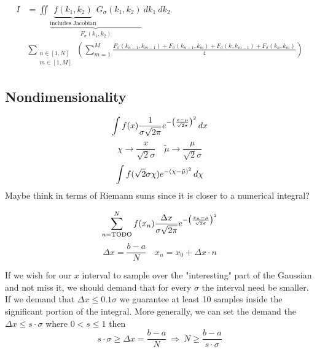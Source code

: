 \begin{align}
I&=\iint\limits \underbrace{ \underbrace{ f(k_{1},k_{2}) }_{ \text{includes Jacobian} } G_{\sigma}(k_{1}, k_{2})  }_{ F_{\sigma}(k_{1},k_{2}) }\  dk_{1} \ dk_{2} \\
&\sum\limits_{\substack{n\in [1,N]  \\ m \in [1,M]}}\left( \sum\limits_{m=1}^{M} \frac{F_{\sigma}(k_{n-1},k_{m-1})+F_{\sigma}(k_{n-1},k_{m})+F_{\sigma}(k_{},k_{m-1})+F_{\sigma}(k_{n},k_{m})}{4} \right) 
\label{eq:delta_2d_integral}
\end{align}

\subsection{Nondimensionality}

\begin{equation}
\int\limits f(x) \frac{1}{\sigma \sqrt{ 2\pi }} {\Large e^{- \left( \frac{x-\mu}{\sqrt{ 2 }\sigma} \right)^{2} }} \, dx 
\label{eq:delta_nondimensionality_start}
\end{equation}
\begin{equation}
\chi \to \frac{x}{\sqrt{ 2 }\sigma} \quad \tilde{\mu}\to \frac{\mu}{\sqrt{ 2 }\sigma} 
\label{eq:delta_nondimensionality_change}
\end{equation}
\begin{equation}
\int\limits f(\sqrt{ 2 }\sigma\chi) {\Large e^{ -(\chi-\tilde{\mu})^{2} }} \, d\chi
\label{eq:delta_nondimensionality_result}
\end{equation}
Maybe think in terms of Riemann sums since it is closer to a numerical integral?

\begin{equation}
\sum\limits_{n=\text{TODO}}^{N}f(x_{n})  \frac{\Delta x}{\sigma \sqrt{ 2\pi }} {\Large e^{- \left( \frac{x_{n}-\mu}{\sqrt{ 2 }\sigma} \right)^{2} }}
\label{eq:delta_riemann_sum}
\end{equation}
\begin{equation}
\Delta x = \frac{b-a}{N} \quad x_{n} = x_{0}+\Delta x\cdot n
\label{eq:delta_dx_definition}
\end{equation}

If we wish for our $x$ interval to sample over the "interesting" part of the Gaussian and not miss it, we should demand that for every $\sigma$ the interval need be smaller. If we demand that $\Delta x \leq 0.1\sigma$ we guarantee at least 10 samples inside the significant portion of the integral. More generally, we can set the demand the $\Delta x\leq s\cdot\sigma$ where $0<s\leq 1$ then
\begin{equation}
s\cdot\sigma \geq \Delta x = \frac{b-a}{N} \ \Longrightarrow \ N \geq \frac{b-a}{s\cdot\sigma}
\label{eq:delta_sampling_condition}
\end{equation}

